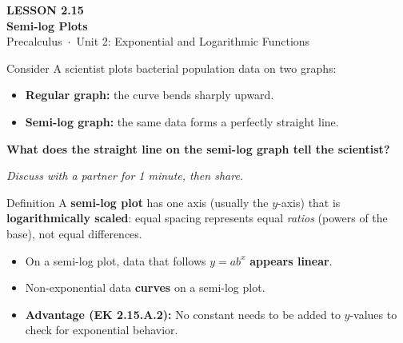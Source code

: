 \documentclass[aspectratio=169, 11pt]{beamer}
\begin{document}
{
\begin{frame}[plain]
  \vspace{2.8cm}\hspace{0.55cm}%
  \begin{minipage}{0.9\textwidth}
    {\color{goldacc}\bfseries\small LESSON 2.15}\\[0.5cm]
    {\color{white}\bfseries\LARGE Semi-log Plots}\\[1.2cm]
    {\color{skymid}\small Precalculus~$\cdot$~Unit 2: Exponential and Logarithmic Functions}
  \end{minipage}
\end{frame}
}

\begin{frame}[t, plain]
  \vspace{0.3cm}
  \begin{block}{Consider}
    A scientist plots bacterial population data on two graphs:
    \begin{itemize}
      \item \textbf{Regular graph:} the curve bends sharply upward.
      \item \textbf{Semi-log graph:} the same data forms a perfectly straight line.
    \end{itemize}
    \vspace{0.2cm}
    \textbf{What does the straight line on the semi-log graph tell the scientist?}
  \end{block}
  \vspace{0.4cm}
  \textit{Discuss with a partner for 1 minute, then share.}
\end{frame}

\begin{frame}[t, plain]
  \vspace{0.2cm}
  \begin{block}{Definition}
    A \textbf{semi-log plot} has one axis (usually the $y$-axis) that is
    \textbf{logarithmically scaled}: equal spacing represents equal \emph{ratios}
    (powers of the base), not equal differences.
  \end{block}
  \vspace{0.3cm}
  \begin{itemize}
    \setlength{\itemsep}{8pt}
    \item On a semi-log plot, data that follows $y = ab^x$ \textbf{appears linear}.
    \item Non-exponential data \textbf{curves} on a semi-log plot.
    \item \textbf{Advantage (EK 2.15.A.2):} No constant needs to be added to $y$-values
          to check for exponential behavior.
  \end{itemize}
\end{frame}
\end{document}
